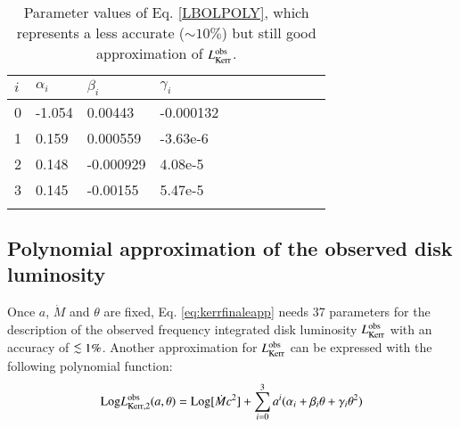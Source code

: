 \documentclass{aa}
\def\spose#1{\hbox to 0pt{#1\hss}}
\newcommand\lsim{\mathrel{\spose{\lower 3pt\hbox{$\mathchar"218$}}
     \raise 2.0pt\hbox{$\mathchar"13C$}}}
\begin{document}
\begin{table}
\centering
\begin{tabular}{lllllllllll}
\hline 
$i$ & \hspace{6mm} $\alpha_i$ & \hspace{6mm} $\beta_i$ & \hspace{6mm} $\gamma_i$ \\
\hline
0	& \hspace{6mm} -1.054	& \hspace{6mm} 0.00443	& \hspace{6mm} -0.000132	\\
1	& \hspace{6mm} 0.159	    & \hspace{6mm} 0.000559	& \hspace{6mm} -3.63e-6 \\
2	& \hspace{6mm} 0.148		& \hspace{6mm} -0.000929	& \hspace{6mm} 4.08e-5 \\
3	& \hspace{6mm} 0.145		& \hspace{6mm} -0.00155	& \hspace{6mm} 5.47e-5 \\
\hline \\
\end{tabular}
\caption{Parameter values of Eq. \eqref{LBOLPOLY}, which represents a less accurate ($\sim 10 \%$) but still good approximation of $L^{\rm obs}_{\rm Kerr}$.       \label{tab:parPOLY}}
\end{table}

\subsection{Polynomial approximation of the observed disk luminosity} \label{POLY}

Once $a$, $\dot{M}$ and $\theta$ are fixed, Eq. \eqref{eq:kerrfinaleapp} needs 37 parameters for the description of the observed frequency integrated disk luminosity $L^{\rm obs}_{\rm Kerr}$ with an accuracy of $\lsim 1 \%$. Another approximation for $L^{\rm obs}_{\rm Kerr}$ can be expressed with the following polynomial function:
	\begin{equation} \label{LBOLPOLY}
		\text{Log} L^{\rm obs}_{\rm Kerr, 2}(a, \theta) = \text{Log} [\dot{M} c^2] + \sum_{i = 0}^{3} a^{i} (\alpha_i + \beta_i \theta + \gamma_i \theta^2)
	\end{equation}
\end{document}
